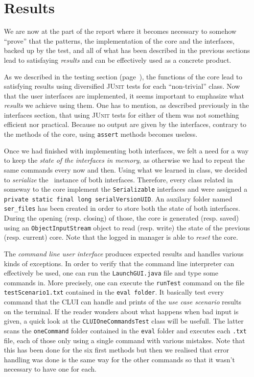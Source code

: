 \section{Results} %
\label{sec:results}
We are now at the part of the report where it becomes necessary to somehow
``prove'' that the patterns, the implementation of the core and the interfaces,
backed up by the test, and all of what has been described in the previous sections 
lead to satisfaying \emph{results} and can be effectively used as a concrete product.

As we described in the testing section (page~\pageref{sec:testing}), the functions of
the core lead to satisfying results using diversified \textsc{JUnit} tests for each
``non-trivial'' class.
Now that the user interfaces are implemented, it seems important to emphasize
what \emph{results} we achieve using them.
One has to mention, as described previously in the interfaces section, 
that using \textsc{JUnit} tests for either of them was not something efficient
nor practical.
Because no output are given by the interfaces, contrary to the methods of the core,
using \texttt{assert} methods becomes useless.

Once we had finished with implementing both interfaces, we felt a need for a way
to keep the \emph{state of the interfaces in memory}, as otherwise we had to repeat
the same commands every now and then.
Using what we learned in class, we decided to \emph{serialize} the \Core~instance
of both interfaces.
Therefore, every class related in someway to the core implement the \lstinline|Serializable|
interfaces and were assigned a \lstinline|private static final long serialVersionUID|.
An auxilary folder named \texttt{ser\_files} has been created in order to store
both the state of both interfaces.
During the opening (resp. closing) of those, the core is generated
(resp. saved) using an \lstinline|ObjectInputStream| object to read (resp. write)
the state of the previous (resp. current) core.
Note that the logged in manager is able to \emph{reset} the core.




The \emph{command line user interface} produces expected results and handles
various kinds of exceptions.
In order to verify that the command line interpreter can effectively be used,
one can run the \lstinline|LaunchGUI.java| file and type some commands in.
More precisely, one can execute the \lstinline|runTest| command on
the file \texttt{testScenario1.txt} contained in the \texttt{eval folder}.
It basically test every command that the CLUI can handle and prints
of the \emph{use case scenario} results on the terminal.
If the reader wonders about what happens when bad input is given,
a quick look at the \lstinline|CLUIOneCommandsTest| class will be usefull.
The latter scans the \texttt{oneCommand} folder contained in the \texttt{eval}
folder and executes each \texttt{.txt} file, each of those only using
a single command with various mistakes.
Note that this has been done for the six first methods but then we realised
that error handling was done is the same way for the other commands
so that it wasn't necessary to have one for each.

